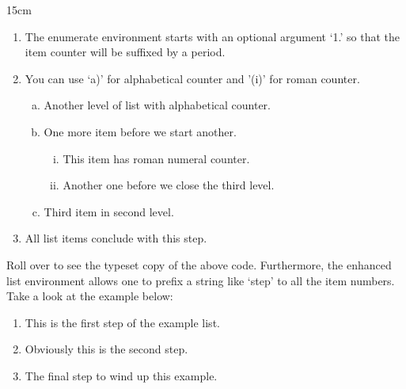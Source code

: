\documentclass[a4paper,12pt]{article}
\begin{document}
\begin{toolwrite}{15cm}
 \begin{enumerate}[1.]
 \item The enumerate environment starts with an optional
   argument `1.' so that the item counter will be suffixed
   by a period.
 \item You can use `a)' for alphabetical counter and '(i)' for
   roman counter.
  \begin{enumerate}[a)]
    \item Another level of list with alphabetical counter.
    \item One more item before we start another.
    \begin{enumerate}[(i)]
     \item This item has roman numeral counter.
     \item Another one before we close the third level.
    \end{enumerate}
    \item Third item in second level.
  \end{enumerate}
 \item All list items conclude with this step.
\end{enumerate}
\end{toolwrite}

Roll over  to see the typeset copy of
the above code.
Furthermore, the enhanced list environment allows one to prefix a
string like `step' to all the item numbers.  Take a look at the
example below:

\begin{vquote}
 \begin{enumerate}[Step 1.]
  \item This is the first step of the example list.
  \item Obviously this is the second step.
  \item The final step to wind up this example.
 \end{enumerate}
\end{vquote}
\end{document}
